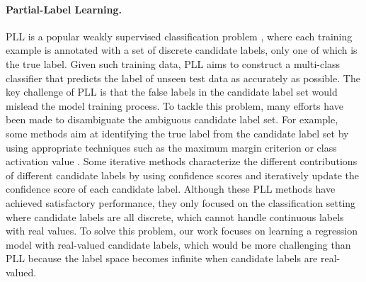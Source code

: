 \documentclass[letterpaper]{article} %
\begin{document}
\paragraph{Partial-Label Learning.} PLL is a popular weakly supervised classification problem \cite{gong2021top,gong2022partial}, where each training example is annotated with a set of discrete candidate labels, only one of which is the true label. Given such training data, PLL aims to construct a multi-class classifier that predicts the label of unseen test data as accurately as possible. The key challenge of PLL is that the false labels in the candidate label set would mislead the model training process. To tackle this problem, many efforts have been made to disambiguate the ambiguous candidate label set. For example, some methods aim at identifying the true label from the candidate label set by using appropriate techniques such as the maximum margin criterion \cite{nguyen2008classification,yu2016maximum} or class activation value \cite{zhang2022exploiting}. Some iterative methods \cite{feng2019partial,lv2020progressive,feng2020provably} characterize the different contributions of different candidate labels by using confidence scores and iteratively update the confidence score of each candidate label. Although these PLL methods have achieved satisfactory performance, they only focused on the classification setting where candidate labels are all discrete, which cannot handle continuous labels with real values. To solve this problem, our work focuses on learning a regression model with real-valued candidate labels, which would be more challenging than PLL because the label space becomes infinite when candidate labels are real-valued.
\end{document}
